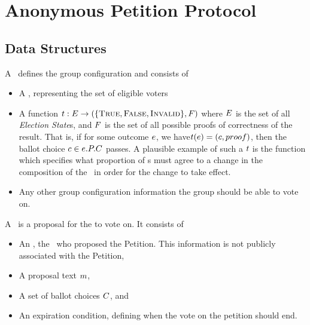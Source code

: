 \section{Anonymous Petition Protocol}
\subsection{Data Structures}
  A \KwManifest~defines the group configuration and consists of
  \begin{itemize}
    \item A \KwRoster, representing the set of eligible voters
    \item A function $t : E \to (\{\textsc{True}, \textsc{False}, \textsc{Invalid}\}, F)$
      where $E$ is the set of all \emph{Election State}s, and
      $F$ is the set of all possible proofs of correctness of the result.
      That is, if for some outcome $e$, we
      have$t(e) = (c, proof)$, then the ballot
      choice $c \in e.P.C$ passes.  A
      plausible example of such a $t$ is the function which specifies
      what proportion of \KwPeer s must agree to a change in the composition of
      the \KwRoster~in order for the change to take effect.
    \item Any other group configuration information the group should be able to
      vote on.
  \end{itemize}

  A \StructPetition~is a proposal for the \KwCluster to vote on. It consists of
    \begin{itemize}
      \item An \StructInstigator, the \KwPeer~who proposed the
        Petition. This information is not publicly associated with
        the Petition,
      \item A proposal text $m$,
      \item A set of ballot choices $C$, and
      \item An expiration condition,
        defining when the vote on the petition should end.
    \end{itemize}

